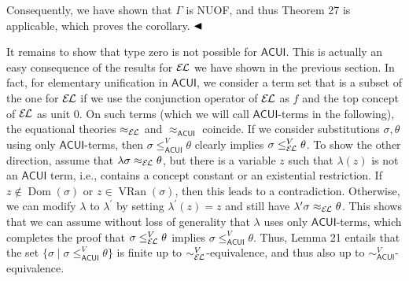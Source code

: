 \documentclass[10pt,a4paper]{amsart}
\begin{document}
 
 
Consequently, we have shown that $\Gamma$ is NUOF, and thus Theorem 27 is applicable, which proves the corollary. $\hfill\blacktriangleleft$\par
 
 
 
It remains to show that type zero is not possible for $\mathsf{ACUI}$. This is actually an easy consequence of the results for $\mathcal{E\mkern-1.618muL}$ we have shown in the previous section. In fact, for elementary unification in $\mathsf{ACUI}$, we consider a term set that is a subset of the one for $\mathcal{E\mkern-1.618muL}$ if we use the conjunction operator of $\mathcal{E\mkern-1.618muL}$ as $f$ and the top concept of $\mathcal{E\mkern-1.618muL}$ as unit $0$. On such terms (which we will call $\mathsf{ACUI}$-terms in the following), the equational theories $\approx_{\mathcal{E\mkern-1.618muL}}$ and $\approx_{\mathsf{ACUI}}$ coincide. If we consider substitutions $\sigma,\theta$ using only $\mathsf{ACUI}$-terms, then $\sigma\leq_{\mathsf{ACUI}}^{V}\theta$ clearly implies $\sigma\leq_{\mathcal{E\mkern-1.618muL}}^{V}\theta$. To show the other direction, assume that $\lambda\sigma\approx_{\mathcal{E\mkern-1.618muL}}\theta$, but there is a variable $z$ such that $\lambda(z)$ is not an $\mathsf{ACUI}$ term, i.e., contains a concept constant or an existential restriction. If $z\not\in\operatorname{Dom}(\sigma)$ or $z\in\operatorname{VRan}(\sigma)$, then this leads to a contradiction. Otherwise, we can modify $\lambda$ to $\lambda^{\prime}$ by setting $\lambda^{\prime}(z)=z$ and still have $\lambda^{\prime}\sigma\approx_{\mathcal{E\mkern-1.618muL}}\theta$. This shows that we can assume without loss of generality that $\lambda$ uses only $\mathsf{ACUI}$-terms, which completes the proof that $\sigma\leq_{\mathcal{E\mkern-1.618muL}}^{V}\theta$ implies $\sigma\leq_{\mathsf{ACUI}}^{V}\theta$. Thus, Lemma 21 entails that the set $\{\sigma\mid\sigma\leq_{\mathsf{ACUI}}^{V}\theta\}$ is finite up to $\sim_{\mathcal{E\mkern-1.618muL}}^{V}$-equivalence, and thus also up to $\sim_{\mathsf{ACUI}}^{V}$-equivalence.\par
 

 
\end{document}
